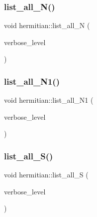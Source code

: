 \subsubsection{\texorpdfstring{list\+\_\+all\+\_\+\+N()}{list\_all\_N()}}
{\footnotesize\ttfamily void hermitian\+::list\+\_\+all\+\_\+N (\begin{DoxyParamCaption}\item[{\mbox{\hyperlink{galois_8h_a09fddde158a3a20bd2dcadb609de11dc}{I\+NT}}}]{verbose\+\_\+level }\end{DoxyParamCaption})}

\mbox{\label{classhermitian_ae8094c1f22738d61696c3ecdee6749c9}} 
\subsubsection{\texorpdfstring{list\+\_\+all\+\_\+\+N1()}{list\_all\_N1()}}
{\footnotesize\ttfamily void hermitian\+::list\+\_\+all\+\_\+\+N1 (\begin{DoxyParamCaption}\item[{\mbox{\hyperlink{galois_8h_a09fddde158a3a20bd2dcadb609de11dc}{I\+NT}}}]{verbose\+\_\+level }\end{DoxyParamCaption})}

\mbox{\label{classhermitian_ab0a4319e5d2040ca2c3fdc2191b98c7b}} 
\subsubsection{\texorpdfstring{list\+\_\+all\+\_\+\+S()}{list\_all\_S()}}
{\footnotesize\ttfamily void hermitian\+::list\+\_\+all\+\_\+S (\begin{DoxyParamCaption}\item[{\mbox{\hyperlink{galois_8h_a09fddde158a3a20bd2dcadb609de11dc}{I\+NT}}}]{verbose\+\_\+level }\end{DoxyParamCaption})}

\mbox{\label{classhermitian_a84c1abdcb4474b87a2a942f5ff4b0b1c}} 
